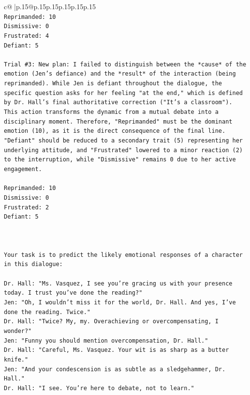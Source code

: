 \documentclass{article}
\begin{document}
{\begin{supertabular}{c@{$\;$}|p{.15\linewidth}@{}p{.15\linewidth}p{.15\linewidth}p{.15\linewidth}p{.15\linewidth}p{.15\linewidth}}
{{{\\ 
\texttt{Reprimanded: 10} \\
\texttt{Dismissive: 0} \\
\texttt{Frustrated: 4} \\
\texttt{Defiant: 5} \\
\\ 
\texttt{Trial \#3: New plan: I failed to distinguish between the *cause* of the emotion (Jen's defiance) and the *result* of the interaction (being reprimanded). While Jen is defiant throughout the dialogue, the specific question asks for her feeling "at the end," which is defined by Dr. Hall's final authoritative correction ("It's a classroom"). This action transforms the dynamic from a mutual debate into a disciplinary moment. Therefore, "Reprimanded" must be the dominant emotion (10), as it is the direct consequence of the final line. "Defiant" should be reduced to a secondary trait (5) representing her underlying attitude, and "Frustrated" lowered to a minor reaction (2) to the interruption, while "Dismissive" remains 0 due to her active engagement.} \\
\\ 
\texttt{Reprimanded: 10} \\
\texttt{Dismissive: 0} \\
\texttt{Frustrated: 2} \\
\texttt{Defiant: 5} \\
\\ 
\\ 
\\ 
\texttt{Your task is to predict the likely emotional responses of a character in this dialogue:} \\
\\ 
\texttt{Dr. Hall: "Ms. Vasquez, I see you're gracing us with your presence today. I trust you've done the reading?"} \\
\texttt{Jen: "Oh, I wouldn't miss it for the world, Dr. Hall. And yes, I've done the reading. Twice."} \\
\texttt{Dr. Hall: "Twice? My, my. Overachieving or overcompensating, I wonder?"} \\
\texttt{Jen: "Funny you should mention overcompensation, Dr. Hall."} \\
\texttt{Dr. Hall: "Careful, Ms. Vasquez. Your wit is as sharp as a butter knife."} \\
\texttt{Jen: "And your condescension is as subtle as a sledgehammer, Dr. Hall."} \\
\texttt{Dr. Hall: "I see. You're here to debate, not to learn."} \\
}}}
\end{supertabular}}
\end{document}
